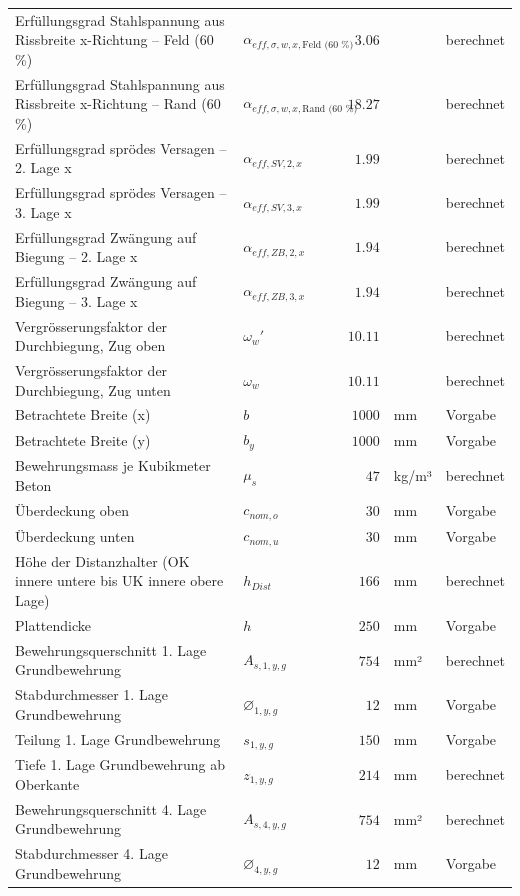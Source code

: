 \documentclass[11pt,a4paper]{article}
\begin{document}
\begin{xltabular}{\linewidth}{>{\raggedright\arraybackslash}Xlrll}
Erfüllungsgrad Stahlspannung aus Rissbreite x-Richtung – Feld (60 \%) & $\alpha_{eff,\sigma,w,x,\text{Feld (60 \%)}}$ & $3.06$ &  & berechnet \\
Erfüllungsgrad Stahlspannung aus Rissbreite x-Richtung – Rand (60 \%) & $\alpha_{eff,\sigma,w,x,\text{Rand (60 \%)}}$ & $18.27$ &  & berechnet \\
Erfüllungsgrad sprödes Versagen – 2. Lage x & $\alpha_{eff,SV,2,x}$ & $1.99$ &  & berechnet \\
Erfüllungsgrad sprödes Versagen – 3. Lage x & $\alpha_{eff,SV,3,x}$ & $1.99$ &  & berechnet \\
Erfüllungsgrad Zwängung auf Biegung – 2. Lage x & $\alpha_{eff,ZB,2,x}$ & $1.94$ &  & berechnet \\
Erfüllungsgrad Zwängung auf Biegung – 3. Lage x & $\alpha_{eff,ZB,3,x}$ & $1.94$ &  & berechnet \\
Vergrösserungsfaktor der Durchbiegung, Zug oben & $\omega_w'$ & $10.11$ &  & berechnet \\
Vergrösserungsfaktor der Durchbiegung, Zug unten & $\omega_w$ & $10.11$ &  & berechnet \\
Betrachtete Breite (x) & $b$ & $1000$ & mm & Vorgabe \\
Betrachtete Breite (y) & $b_y$ & $1000$ & mm & Vorgabe \\
Bewehrungsmass je Kubikmeter Beton & $\mu_s$ & $47$ & kg/m³ & berechnet \\
Überdeckung oben & $c_{nom,o}$ & $30$ & mm & Vorgabe \\
Überdeckung unten & $c_{nom,u}$ & $30$ & mm & Vorgabe \\
Höhe der Distanzhalter (OK innere untere bis UK innere obere Lage) & $h_{Dist}$ & $166$ & mm & berechnet \\
Plattendicke & $h$ & $250$ & mm & Vorgabe \\
Bewehrungsquerschnitt 1. Lage Grundbewehrung & $A_{s,1,y,g}$ & $754$ & mm² & berechnet \\
Stabdurchmesser 1. Lage Grundbewehrung & $\varnothing_{1,y,g}$ & $12$ & mm & Vorgabe \\
Teilung 1. Lage Grundbewehrung & $s_{1,y,g}$ & $150$ & mm & Vorgabe \\
Tiefe 1. Lage Grundbewehrung ab Oberkante & $z_{1,y,g}$ & $214$ & mm & berechnet \\
Bewehrungsquerschnitt 4. Lage Grundbewehrung & $A_{s,4,y,g}$ & $754$ & mm² & berechnet \\
Stabdurchmesser 4. Lage Grundbewehrung & $\varnothing_{4,y,g}$ & $12$ & mm & Vorgabe \\

\end{xltabular}
\end{document}
